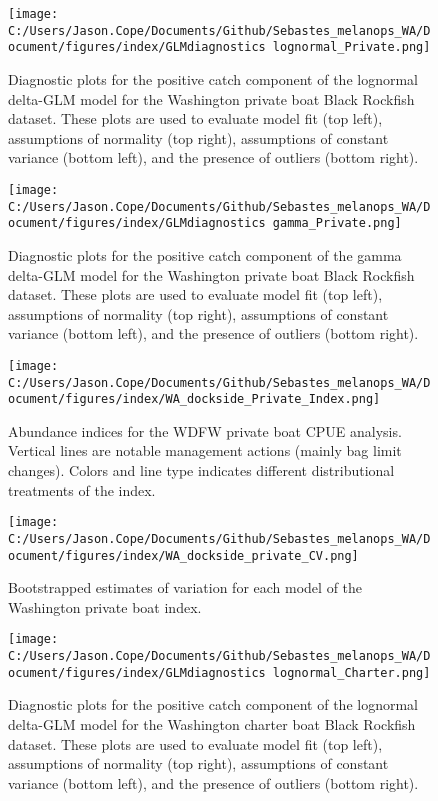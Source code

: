\documentclass[11pt,
  english,
  letterpaper,
]{article}
\begin{document}
\begin{figure}
\centering
\texttt{[image: C:/Users/Jason.Cope/Documents/Github/Sebastes\_melanops\_WA/Document/figures/index/GLMdiagnostics lognormal\_Private.png]}
\caption{Diagnostic plots for the positive catch component of the lognormal delta-GLM model for the Washington private boat Black Rockfish dataset. These plots are used to evaluate model fit (top left), assumptions of normality (top right), assumptions of constant variance (bottom left), and the presence of outliers (bottom right).\label{fig:private-log-diags}}
\end{figure}

\begin{figure}
\centering
\texttt{[image: C:/Users/Jason.Cope/Documents/Github/Sebastes\_melanops\_WA/Document/figures/index/GLMdiagnostics gamma\_Private.png]}
\caption{Diagnostic plots for the positive catch component of the gamma delta-GLM model for the Washington private boat Black Rockfish dataset. These plots are used to evaluate model fit (top left), assumptions of normality (top right), assumptions of constant variance (bottom left), and the presence of outliers (bottom right).\label{fig:private-gam-diags}}
\end{figure}

\begin{figure}
\centering
\texttt{[image: C:/Users/Jason.Cope/Documents/Github/Sebastes\_melanops\_WA/Document/figures/index/WA\_dockside\_Private\_Index.png]}
\caption{Abundance indices for the WDFW private boat CPUE analysis. Vertical lines are notable management actions (mainly bag limit changes). Colors and line type indicates different distributional treatments of the index.\label{fig:private-index}}
\end{figure}

\begin{figure}
\centering
\texttt{[image: C:/Users/Jason.Cope/Documents/Github/Sebastes\_melanops\_WA/Document/figures/index/WA\_dockside\_private\_CV.png]}
\caption{Bootstrapped estimates of variation for each model of the Washington private boat index.\label{fig:private-CVs}}
\end{figure}

\begin{figure}
\centering
\texttt{[image: C:/Users/Jason.Cope/Documents/Github/Sebastes\_melanops\_WA/Document/figures/index/GLMdiagnostics lognormal\_Charter.png]}
\caption{Diagnostic plots for the positive catch component of the lognormal delta-GLM model for the Washington charter boat Black Rockfish dataset. These plots are used to evaluate model fit (top left), assumptions of normality (top right), assumptions of constant variance (bottom left), and the presence of outliers (bottom right).\label{fig:charter-log-diags}}
\end{figure}
\end{document}
